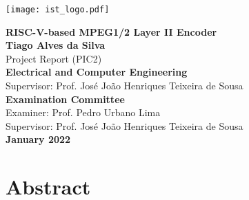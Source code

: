 \documentclass[10pt]{esda}
\title{}
\author{}
\date{}
\begin{document}
\texttt{[image: ist\_logo.pdf]}

\thispagestyle{empty}

\begin{onehalfspace}

\begin{center}
\begin{Large}
  \vspace{3cm}
  {\bf \Large {RISC-V-based MPEG1/2 Layer II Encoder}}\\
  \vspace{2.5cm}
  {\bf \Large Tiago Alves da Silva}\\
  \vspace{2cm}
  \large {Project Report (PIC2)}\\
  \vspace{2mm}
  {\bf \Large {Electrical and Computer Engineering}}\\
  \vspace{1.5cm}
  \large {Supervisor: Prof. José João Henriques Teixeira de Sousa}\\
  \vspace{1.5cm}
  {\bf \Large Examination Committee}\\
  \vspace{1mm}
  \large {Examiner: Prof. Pedro Urbano Lima}\\
  \large {Supervisor: Prof. José João Henriques Teixeira de Sousa}\\
  \vspace{2cm}
  {\bf \Large January 2022 }
\end{Large}
\end{center}

\end{onehalfspace}


\cleardoublepage

\section*{Abstract}

\end{document}
